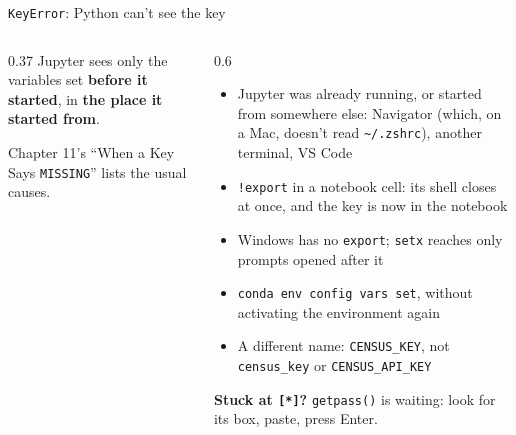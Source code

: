 \documentclass[9pt,aspectratio=169]{beamer}
\begin{document}
\begin{frame}{\texttt{KeyError}: Python can't see the key}
    \begin{columns}[T]
        \begin{column}{0.37\textwidth}
            Jupyter sees only the variables set \textbf{before it started}, in \textbf{the place it started from}.

            \medskip
            Chapter 11's ``When a Key Says \texttt{MISSING}'' lists the usual causes.
        \end{column}
        \begin{column}{0.6\textwidth}
            \begin{itemize}\footnotesize
                \item Jupyter was already running, or started from somewhere else: Navigator (which, on a Mac, doesn't read \texttt{\textasciitilde/.zshrc}), another terminal, VS Code
                \item \texttt{!export} in a notebook cell: its shell closes at once, and the key is now in the notebook
                \item Windows has no \texttt{export}; \texttt{setx} reaches only prompts opened after it
                \item \texttt{conda env config vars set}, without activating the environment again
                \item A different name: \texttt{CENSUS\_KEY}, not \texttt{census\_key} or \texttt{CENSUS\_API\_KEY}
            \end{itemize}
            \medskip
            {\footnotesize \textbf{Stuck at \texttt{[*]}?} \texttt{getpass()} is waiting: look for its box, paste, press Enter.\par}
        \end{column}
    \end{columns}
\end{frame}
\end{document}
